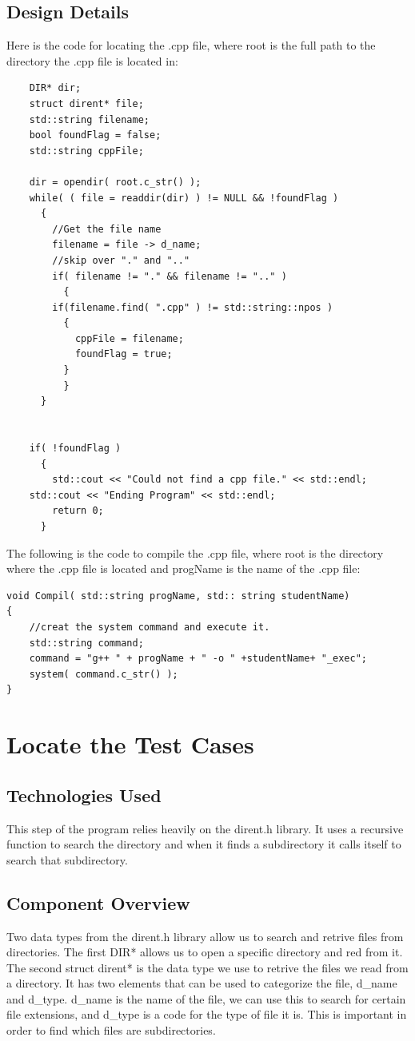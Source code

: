 \subsection{Design Details}
Here is the code for locating the .cpp file, where root is the full path to the directory the .cpp file is located in:
\begin{lstlisting}
    DIR* dir;
    struct dirent* file;
    std::string filename;
    bool foundFlag = false;
    std::string cppFile;

    dir = opendir( root.c_str() );
    while( ( file = readdir(dir) ) != NULL && !foundFlag )
      {
        //Get the file name
        filename = file -> d_name;
        //skip over "." and ".."
        if( filename != "." && filename != ".." )
          {
        if(filename.find( ".cpp" ) != std::string::npos )
          {
            cppFile = filename;
            foundFlag = true;
          }
          }
      }


    if( !foundFlag )
      {
        std::cout << "Could not find a cpp file." << std::endl;
	std::cout << "Ending Program" << std::endl;
        return 0;
      }
\end{lstlisting}

The following is the code to compile the .cpp file, where root is the directory where the .cpp file is located
and progName is the name of the .cpp file:
\begin{lstlisting}
void Compil( std::string progName, std:: string studentName)
{
    //creat the system command and execute it.
    std::string command;
    command = "g++ " + progName + " -o " +studentName+ "_exec";
    system( command.c_str() );
}
\end{lstlisting}



\section{Locate the Test Cases }

\subsection{Technologies  Used}
This step of the program relies heavily on the dirent.h library.  It uses a recursive function to search the directory and when
it finds a subdirectory it calls itself to search that subdirectory.

\subsection{Component  Overview}
Two data types from the dirent.h library allow us to search and retrive files from directories.  The first DIR* allows us to open
a specific directory and red from it.  The second struct dirent* is the data type we use to retrive the files we read from a directory.
It has two elements that can be used to categorize the file, d\_name and d\_type.  d\_name is the name of the file, we can use this
to search for certain file extensions, and d\_type is a code for the type of file it is.  This is important in order to find which files are
subdirectories. 

